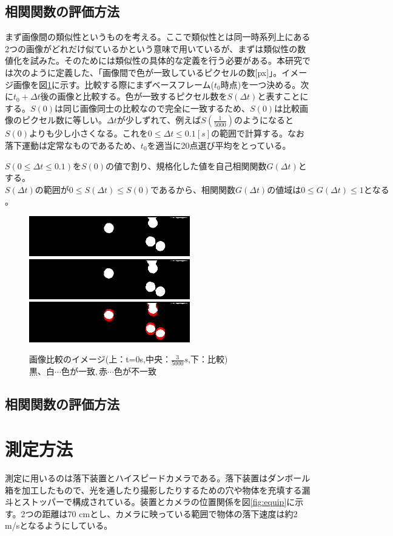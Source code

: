 \documentclass[a4paper,10pt,twocolumn,dvipdfmx]{jsarticle}
\begin{document}
\subsection{相関関数の評価方法}
まず画像間の類似性というものを考える。ここで類似性とは同一時系列上にある2つの画像がどれだけ似ているかという意味で用いているが、まずは類似性の数値化を試みた。そのためには類似性の具体的な定義を行う必要がある。本研究では次のように定義した、「画像間で色が一致しているピクセルの数[px]」。イメージ画像を図\ref{fig:exfall}に示す。比較する際にまずベースフレーム($t_0$時点)を一つ決める。次に$t_0+\Delta t$後の画像と比較する。色が一致するピクセル数を$S(\Delta t)$と表すことにする。$S(0)$は同じ画像同士の比較なので完全に一致するため、$S(0)$は比較画像のピクセル数に等しい。$\Delta t$が少しずれて、例えば$S(\frac{1}{5000})$のようになると$S(0)$よりも少し小さくなる。これを$0 \leq \Delta t \leq 0.1 [s]$の範囲で計算する。なお落下運動は定常なものであるため、$t_0$を適当に20点選び平均をとっている。 \par
$S(0 \leq \Delta t \leq 0.1)をS(0)$の値で割り、規格化した値を自己相関関数$G(\Delta t)$とする。$S(\Delta t)の範囲が0 \leq S(\Delta t) \leq S(0)であるから、相関関数G(\Delta t)の値域は0 \leq G(\Delta t) \leq 1となる$。
\begin{figure}[hbtp]
	\includegraphics[clip,width=7.0cm]{0.png}
	\includegraphics[clip,width=7.0cm]{3.png}
	\includegraphics[clip,width=7.0cm]{0and3.png}
	\caption{画像比較のイメージ(上：t=0s,中央：$\frac{3}{5000}s$,下：比較) \newline $黒、白 \cdots 色が一致 ,赤 \cdots 色が不一致$}
	\label{fig:exfall}
\end{figure}
\subsection{相関関数の評価方法}

\section{測定方法}
測定に用いるのは落下装置とハイスピードカメラである。落下装置はダンボール箱を加工したもので、光を通したり撮影したりするための穴や物体を充填する漏斗とストッパーで構成されている。装置とカメラの位置関係を図\ref{fig:equip}に示す。2つの距離は70 cmとし、カメラに映っている範囲で物体の落下速度は約2 m/sとなるようにしている。
\end{document}
